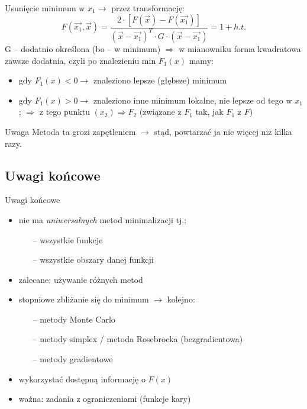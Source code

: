   \begin{frame}
    Usunięcie minimum w $x_{1} \to$ przez transformację:
    \begin{displaymath}
      F(\vec{x_{1}}{,}\vec{x}) =
      \frac{2 \cdot \left[ F(\vec{x}) - F(\vec{x_{1}}) \right]}
      {(\vec{x} - \vec{x_{1}})^T \cdot G \cdot (\vec{x} - \vec{x_{1}})} =
      1 + h.t.
    \end{displaymath}
    G -- dodatnio określona (bo -- w minimum) $\Rightarrow$
    w mianowniku forma kwadratowa zawsze dodatnia, czyli
    po znalezieniu min $F_{1}(x)$ mamy:
    \begin{itemize}
      \item gdy $F_{1}(x) < 0 \to$ znaleziono lepsze
      (głębsze) minimum
      \item gdy $F_{1}(x) > 0 \to$ znaleziono inne minimum
      lokalne, nie lepsze od tego w $x_{1}$; $\Rightarrow$
      z tego punktu $(x_{2}) \Rightarrow F_{2}$ (związane z
      $F_{1}$ tak, jak $F_{1}$ z $F$)
    \end{itemize}
    \begin{alertblock}{Uwaga}
      Metoda ta grozi zapętleniem $\to$ stąd, powtarzać
      ja nie więcej niż kilka razy.
    \end{alertblock}
  \end{frame}

  \subsection{Uwagi końcowe}
  \begin{frame}{Uwagi końcowe}
    \begin{itemize}
      \item nie ma \emph{uniwersalnych} metod
      minimalizacji tj.:
      \begin{itemize}
        \item[--] wszystkie funkcje
        \item[--] wszystkie obszary danej funkcji
      \end{itemize}
      \item zalecane: używanie różnych metod
      \item stopniowe zbliżanie się do minimum $\to$
      kolejno:
      \begin{itemize}
        \item[--] metody Monte Carlo
        \item[--] metody simplex / metoda Rosebrocka
        (bezgradientowa)
        \item[--] metody gradientowe
      \end{itemize}
      \item wykorzystać dostępną informację o $F(x)$
      \item ważna: zadania z ograniczeniami (funkcje kary)
    \end{itemize}
  \end{frame}

